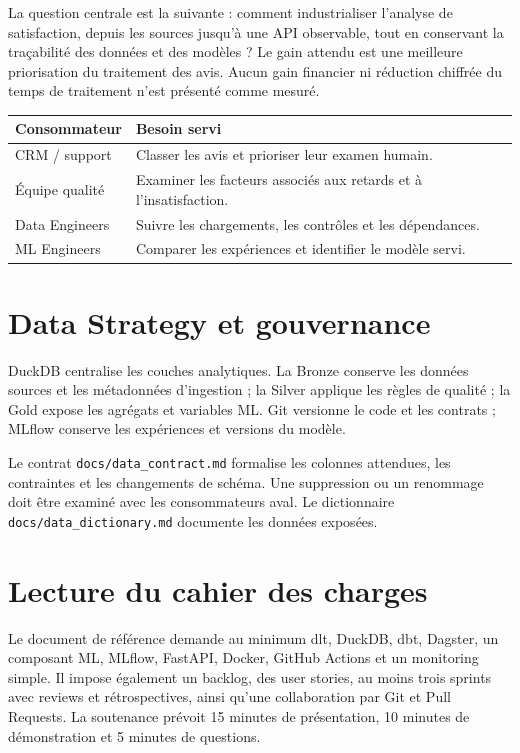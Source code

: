 \documentclass[11pt,a4paper]{report}
\newcommand{\code}[1]{\nolinkurl{#1}}
\begin{document}
La question centrale est la suivante : comment industrialiser l'analyse de satisfaction, depuis les sources jusqu'à une API observable, tout en conservant la traçabilité des données et des modèles ? Le gain attendu est une meilleure priorisation du traitement des avis. Aucun gain financier ni réduction chiffrée du temps de traitement n'est présenté comme mesuré.

\par\noindent\begin{tabularx}{\linewidth}{p{3cm}Y}\toprule
\textbf{Consommateur} & \textbf{Besoin servi}\\\midrule
CRM / support & Classer les avis et prioriser leur examen humain.\\
Équipe qualité & Examiner les facteurs associés aux retards et à l'insatisfaction.\\
Data Engineers & Suivre les chargements, les contrôles et les dépendances.\\
ML Engineers & Comparer les expériences et identifier le modèle servi.\\\bottomrule
\end{tabularx}

\section{Data Strategy et gouvernance}
DuckDB centralise les couches analytiques. La Bronze conserve les données sources et les métadonnées d'ingestion ; la Silver applique les règles de qualité ; la Gold expose les agrégats et variables ML. Git versionne le code et les contrats ; MLflow conserve les expériences et versions du modèle.

Le contrat \code{docs/data_contract.md} formalise les colonnes attendues, les contraintes et les changements de schéma. Une suppression ou un renommage doit être examiné avec les consommateurs aval. Le dictionnaire \code{docs/data_dictionary.md} documente les données exposées.

\section{Lecture du cahier des charges}
Le document de référence demande au minimum dlt, DuckDB, dbt, Dagster, un composant ML, MLflow, FastAPI, Docker, GitHub Actions et un monitoring simple. Il impose également un backlog, des user stories, au moins trois sprints avec reviews et rétrospectives, ainsi qu'une collaboration par Git et Pull Requests. La soutenance prévoit 15 minutes de présentation, 10 minutes de démonstration et 5 minutes de questions.
\end{document}
